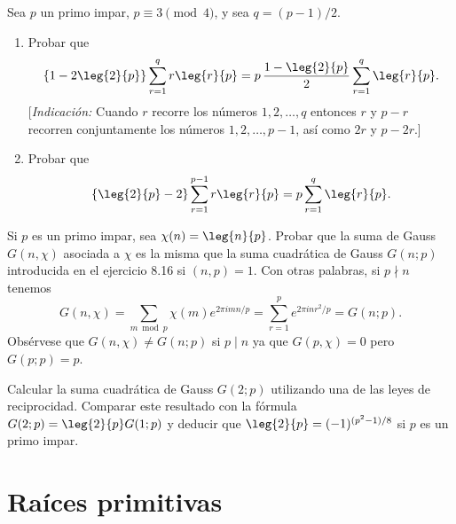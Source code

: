 \documentclass[12pt,a4paper]{book}
\begin{document}
    \begin{ejercicio}
        Sea $p$ un primo impar, $p\equiv3\pmod{4}$, y sea $q=(p-1)/2$.
        \begin{enumerate}
            \item[(a)] Probar que
            \begin{equation*}
                \left\{1-2\leg{2}{p}\right\}\sum_{r=1}^{q}r\leg{r}{p}=p\,\frac{1-\leg{2}{p}}{2}\sum_{r=1}^{q}\leg{r}{p}.
            \end{equation*}
            [\textit{Indicación:} Cuando $r$ recorre los números $1,2,\dots,q$ entonces $r$
            y $p-r$ recorren conjuntamente los números $1,2,\dots,p-1$, así como $2r$ y
            $p-2r$.]
            \item[(b)] Probar que
            \begin{equation*}
                \left\{\leg{2}{p}-2\right\}\sum_{r=1}^{p-1}r\leg{r}{p}=p\sum_{r=1}^{q}\leg{r}{p}.
            \end{equation*}
        \end{enumerate}
    \end{ejercicio}

    \begin{ejercicio}
        Si $p$ es un primo impar, sea $\chi(n)=\leg{n}{p}$. Probar que la suma de Gauss
        $G(n,\chi)$ asociada a $\chi$ es la misma que la suma cuadrática de Gauss
        $G(n;p)$ introducida en el ejercicio 8.16 si $(n,p)=1$. Con otras palabras, si
        $p\nmid n$ tenemos
        \begin{equation*}
            G(n,\chi)=\sum_{m\bmod p}\chi(m)e^{2\pi imn/p}=\sum_{r=1}^{p}e^{2\pi inr^{2}/p}=G(n;p).
        \end{equation*}
        Obsérvese que $G(n,\chi)\neq G(n;p)$ si $p\mid n$ ya que $G(p,\chi)=0$ pero
        $G(p;p)=p$.
    \end{ejercicio}

    \begin{ejercicio}
        Calcular la suma cuadrática de Gauss $G(2;p)$ utilizando una de las leyes de
        reciprocidad. Comparar este resultado con la fórmula
        $G(2;p)=\leg{2}{p}G(1;p)$ y deducir que $\leg{2}{p}=(-1)^{(p^{2}-1)/8}$ si $p$ es un
        primo impar.
    \end{ejercicio}

\chapter{Raíces primitivas}
\end{document}
